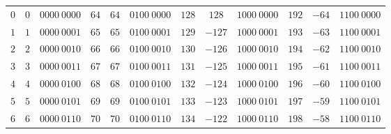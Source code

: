 \begin{center}
    \begin{minipage}{0.5\linewidth}
        \begin{center}
        \begin{tabular}{|c|c|c||c|c|c||c|c|c||c|c|c|}
            \hline
            \rowcolor{primaryheader!15}\textcolor{numColor}{$0$} & \textcolor{twoColor}{$0$} & $0000~0000$ & \textcolor{numColor}{$64$} & \textcolor{twoColor}{$64$} & $0100~0000$ & \textcolor{numColor}{$128$} & \textcolor{twoColor}{$128$} & $1000~0000$ & \textcolor{numColor}{$192$} & \textcolor{twoColor}{$-64$} & $1100~0000$\\ 
            \textcolor{numColor}{$1$} & \textcolor{twoColor}{$1$} & $0000~0001$ & \textcolor{numColor}{$65$} & \textcolor{twoColor}{$65$} & $0100~0001$ & \textcolor{numColor}{$129$} & \textcolor{twoColor}{$-127$} & $1000~0001$ & \textcolor{numColor}{$193$} & \textcolor{twoColor}{$-63$} & $1100~0001$\\ 
            \textcolor{numColor}{$2$} & \textcolor{twoColor}{$2$} & $0000~0010$ & \textcolor{numColor}{$66$} & \textcolor{twoColor}{$66$} & $0100~0010$ & \textcolor{numColor}{$130$} & \textcolor{twoColor}{$-126$} & $1000~0010$ & \textcolor{numColor}{$194$} & \textcolor{twoColor}{$-62$} & $1100~0010$\\ 
            \textcolor{numColor}{$3$} & \textcolor{twoColor}{$3$} & $0000~0011$ & \textcolor{numColor}{$67$} & \textcolor{twoColor}{$67$} & $0100~0011$ & \textcolor{numColor}{$131$} & \textcolor{twoColor}{$-125$} & $1000~0011$ & \textcolor{numColor}{$195$} & \textcolor{twoColor}{$-61$} & $1100~0011$\\ 
            \textcolor{numColor}{$4$} & \textcolor{twoColor}{$4$} & $0000~0100$ & \textcolor{numColor}{$68$} & \textcolor{twoColor}{$68$} & $0100~0100$ & \textcolor{numColor}{$132$} & \textcolor{twoColor}{$-124$} & $1000~0100$ & \textcolor{numColor}{$196$} & \textcolor{twoColor}{$-60$} & $1100~0100$\\ 
            \textcolor{numColor}{$5$} & \textcolor{twoColor}{$5$} & $0000~0101$ & \textcolor{numColor}{$69$} & \textcolor{twoColor}{$69$} & $0100~0101$ & \textcolor{numColor}{$133$} & \textcolor{twoColor}{$-123$} & $1000~0101$ & \textcolor{numColor}{$197$} & \textcolor{twoColor}{$-59$} & $1100~0101$\\ 
            \textcolor{numColor}{$6$} & \textcolor{twoColor}{$6$} & $0000~0110$ & \textcolor{numColor}{$70$} & \textcolor{twoColor}{$70$} & $0100~0110$ & \textcolor{numColor}{$134$} & \textcolor{twoColor}{$-122$} & $1000~0110$ & \textcolor{numColor}{$198$} & \textcolor{twoColor}{$-58$} & $1100~0110$\\ 

\end{tabular}
\end{center}
\end{minipage}
\end{center}
